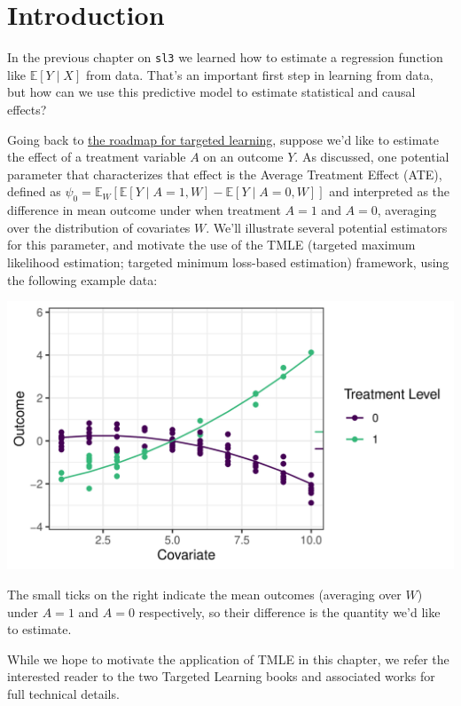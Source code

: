 \documentclass[
  12pt, krantz2,
]{book}
\newcommand{\passthrough}[1]{#1}
\theoremstyle{definition}
\theoremstyle{definition}
\theoremstyle{definition}
\newcommand{\1}{\mathbbm{1}}
\begin{document}
\hypertarget{tmle-intro}{%
\section{Introduction}\label{tmle-intro}}

In the previous chapter on \passthrough{\lstinline!sl3!} we learned how to estimate a regression
function like \(\mathbb{E}[Y \mid X]\) from data. That's an important first step
in learning from data, but how can we use this predictive model to estimate
statistical and causal effects?

Going back to \protect\hyperlink{intro}{the roadmap for targeted learning}, suppose we'd like to
estimate the effect of a treatment variable \(A\) on an outcome \(Y\). As discussed,
one potential parameter that characterizes that effect is the Average Treatment
Effect (ATE), defined as \(\psi_0 = \mathbb{E}_W[\mathbb{E}[Y \mid A=1,W] - \mathbb{E}[Y \mid A=0,W]]\) and interpreted as the difference in mean outcome
under when treatment \(A=1\) and \(A=0\), averaging over the distribution of
covariates \(W\). We'll illustrate several potential estimators for this
parameter, and motivate the use of the TMLE (targeted maximum likelihood
estimation; targeted minimum loss-based estimation) framework, using the
following example data:

\begin{center}\includegraphics[width=0.8\linewidth]{img/png/schematic_1_truedgd} \end{center}

The small ticks on the right indicate the mean outcomes (averaging over \(W\))
under \(A=1\) and \(A=0\) respectively, so their difference is the quantity we'd
like to estimate.

While we hope to motivate the application of TMLE in this chapter, we refer the
interested reader to the two Targeted Learning books and associated works for
full technical details.
\end{document}
